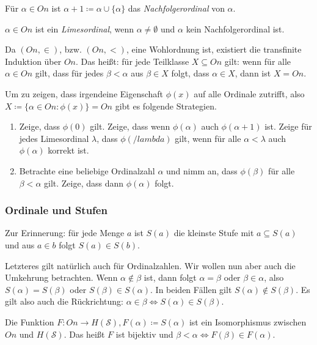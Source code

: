 \begin{definition}[Nachfolgerordinal]
	Für $\alpha\in On$ ist $\alpha+1\coloneqq\alpha\cup \{\alpha\}$ das \textit{Nachfolgerordinal} von $\alpha$.
\end{definition}

\begin{definition}[Limesordinal]
	$\alpha\in On$ ist ein \textit{Limesordinal}, wenn $\alpha\neq\emptyset$ und $\alpha$ kein Nachfolgerordinal ist.
\end{definition}

Da $(On,\in)$, bzw. $(On,<)$, eine Wohlordnung ist, existiert die transfinite Induktion über $On$. Das heißt: für jede Teilklasse $X\subseteq On$ gilt: wenn für alle $\alpha\in On$ gilt, dass für jedes $\beta<\alpha$ aus $\beta\in X$ folgt, dass $\alpha\in X$, dann ist $X=On$.

Um zu zeigen, dass irgendeine Eigenschaft $\phi(x)$ auf alle Ordinale zutrifft, also $X\coloneqq\{\alpha\in On : \phi(x)\}=On$ gibt es folgende Strategien.
\begin{enumerate}
	\item Zeige, dass $\phi(0)$ gilt. Zeige, dass wenn $\phi(\alpha)$ auch $\phi(\alpha+1)$ ist. Zeige für jedes Limesordinal $\lambda$, dass $\phi(/lambda)$ gilt, wenn für alle $\alpha<\lambda$ auch $\phi(\alpha)$ korrekt ist.
	
	\item Betrachte eine beliebige Ordinalzahl $\alpha$ und nimm an, dass $\phi(\beta)$ für alle $\beta<\alpha$ gilt. Zeige, dass dann $\phi(\alpha)$ folgt.
\end{enumerate}

\subsubsection{Ordinale und Stufen}

Zur Erinnerung: für jede Menge $a$ ist $S(a)$ die kleinste Stufe mit $a\subseteq S(a)$ und aus $a\in b$ folgt $S(a)\in S(b)$.

Letzteres gilt natürlich auch für Ordinalzahlen. Wir wollen nun aber auch die Umkehrung betrachten. Wenn $\alpha\notin\beta$ ist, dann folgt $\alpha=\beta$ oder $\beta\in\alpha$, also $S(\alpha)=S(\beta)$ oder $S(\beta)\in S(\alpha)$. In beiden Fällen gilt $S(\alpha)\notin S(\beta)$. Es gilt also auch die Rückrichtung: $\alpha\in\beta \Leftrightarrow S(\alpha)\in S(\beta)$.

\begin{satz}
	Die Funktion $F:On \to H(\mathcal{S}), F(\alpha)\coloneqq S(\alpha)$ ist ein Isomorphismus zwischen $On$ und $H(\mathcal{S})$. Das heißt $F$ ist bijektiv und $\beta<\alpha \Leftrightarrow F(\beta)\in F(\alpha)$.
\end{satz}

